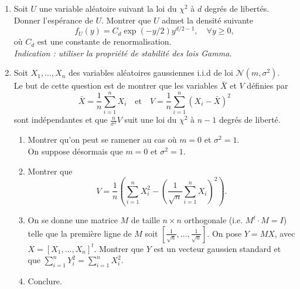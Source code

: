 \begin{mdframed}
\begin{exercice}
\begin{enumerate}
    \item Soit $U$ une variable aléatoire suivant la loi du $\chi^2$ à $d$ degrés de libertés. Donner l'espérance de $U$. Montrer que $U$ admet la densité suivante
    \begin{equation*}
    f_U(y) = C_d \exp(-y/2) y^{d/2 - 1}, \quad \forall y \ge 0,
    \end{equation*}
    où $C_d$ est une constante de renormalisation.\\
    \textit{Indication : utiliser la propriété de stabilité des lois Gamma.}
    
    \item Soit $X_1, \dots, X_n$ des variables aléatoires gaussiennes i.i.d de loi $\mathcal{N}(m, \sigma^2)$.\\
    Le but de cette question est de montrer que les variables $\bar{X}$ et $V$ définies par
    \begin{equation*}
    \bar{X} = \frac{1}{n}\sum_{i=1}^n X_i \quad \text{et} \quad V = \frac{1}{n}\sum_{i=1}^n (X_i - \bar{X})^2
    \end{equation*}
    sont indépendantes et que $\frac{n}{\sigma^2}V$ suit une loi du $\chi^2$ à $n - 1$ degrés de liberté.
    \begin{enumerate}
        \item[i--] Montrer qu'on peut se ramener au cas où $m = 0$ et $\sigma^2 = 1$.\\
        On suppose désormais que $m = 0$ et $\sigma^2 = 1$.
        \item[ii--] Montrer que
        \begin{equation*}
        V = \frac{1}{n} \left( \sum_{i=1}^n X_i^2 - \left( \frac{1}{\sqrt{n}} \sum_{i=1}^n X_i \right)^2 \right).
        \end{equation*}
        \item[iii--] On se donne une matrice $M$ de taille $n \times n$ orthogonale (i.e. $M^t \cdot M = I$) telle que la première ligne de $M$ soit $[\frac{1}{\sqrt{n}}, \dots, \frac{1}{\sqrt{n}}]$. On pose $Y = MX$, avec $X = [X_1, \dots, X_n]^t$. Montrer que $Y$ est un vecteur gaussien standard et que $\sum_{i=1}^n Y_i^2 = \sum_{i=1}^n X_i^2$.
        \item[iv--] Conclure.
    \end{enumerate}
\end{enumerate}
\end{exercice}
\end{mdframed}


